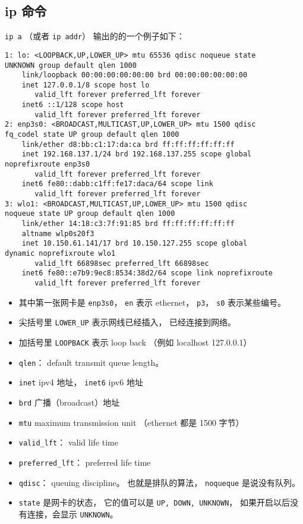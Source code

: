 \subsection{ip 命令}
\verb`ip a` （或者 \verb`ip addr`） 输出的的一个例子如下：
\begin{lstlisting}[language=none]
1: lo: <LOOPBACK,UP,LOWER_UP> mtu 65536 qdisc noqueue state 
UNKNOWN group default qlen 1000
    link/loopback 00:00:00:00:00:00 brd 00:00:00:00:00:00
    inet 127.0.0.1/8 scope host lo
       valid_lft forever preferred_lft forever
    inet6 ::1/128 scope host 
       valid_lft forever preferred_lft forever
2: enp3s0: <BROADCAST,MULTICAST,UP,LOWER_UP> mtu 1500 qdisc
fq_codel state UP group default qlen 1000
    link/ether d8:bb:c1:17:da:ca brd ff:ff:ff:ff:ff:ff
    inet 192.168.137.1/24 brd 192.168.137.255 scope global 
noprefixroute enp3s0
       valid_lft forever preferred_lft forever
    inet6 fe80::dabb:c1ff:fe17:daca/64 scope link 
       valid_lft forever preferred_lft forever
3: wlo1: <BROADCAST,MULTICAST,UP,LOWER_UP> mtu 1500 qdisc
noqueue state UP group default qlen 1000
    link/ether 14:18:c3:7f:91:85 brd ff:ff:ff:ff:ff:ff
    altname wlp0s20f3
    inet 10.150.61.141/17 brd 10.150.127.255 scope global 
dynamic noprefixroute wlo1
       valid_lft 66898sec preferred_lft 66898sec
    inet6 fe80::e7b9:9ec8:8534:38d2/64 scope link noprefixroute 
       valid_lft forever preferred_lft forever
\end{lstlisting}
\begin{itemize}
\item 其中第一张网卡是 \verb`enp3s0`， \verb`en` 表示 ethernet， \verb`p3`， \verb`s0` 表示某些编号。
\item 尖括号里 \verb`LOWER_UP` 表示网线已经插入， 已经连接到网络。
\item 加括号里 \verb`LOOPBACK` 表示 loop back （例如 localhost 127.0.0.1）
\item \verb`qlen`： default transmit queue length。
\item \verb`inet` ipv4 地址， \verb`inet6` ipv6 地址
\item \verb`brd` 广播（broadcast）地址
\item \verb`mtu` maximum transmission unit （ethernet 都是 1500 字节）
\item \verb`valid_lft`： valid life time
\item \verb`preferred_lft`： preferred life time
\item \verb`qdisc`： queuing discipline。 也就是排队的算法， \verb`noqueque` 是说没有队列。
\item \verb`state` 是网卡的状态， 它的值可以是 \verb`UP, DOWN, UNKNOWN`， 如果开启以后没有连接，会显示 \verb`UNKNOWN`。
\end{itemize}


